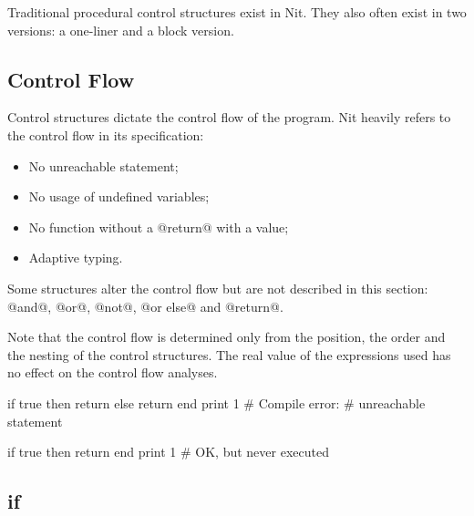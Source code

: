 Traditional procedural control structures exist in Nit.
They also often exist in two versions: a one-liner and a block version.

\subsection{Control Flow}\label{control flow}

Control structures dictate the control flow of the program.
Nit heavily refers to the control flow in its specification:
\begin{itemize}
\item No unreachable statement;
\item No usage of undefined variables;
\item No function without a @return@ with a value;
\item Adaptive typing.
\end{itemize}

Some structures alter the control flow but are not described in this section: @and@, @or@, @not@, @or else@ and @return@.

Note that the control flow is determined only from the position, the order and the nesting of the control structures.
The real value of the expressions used has no effect on the control flow analyses.
\begin{multicols}{2}
\begin{lst}
if true then
	return
else
	return
end
print 1
# Compile error: 
# unreachable statement
\end{lst}
\columnbreak
\begin{lst}
if true then
	return
end
print 1
# OK, but never executed
\end{lst}
\end{multicols}

\subsection{if}\label{if}

